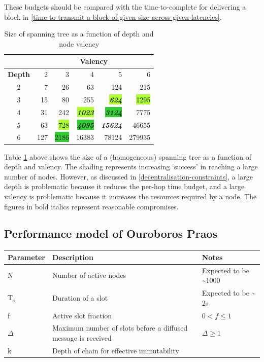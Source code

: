\documentclass[11pt,a4paper]{article}
\begin{document}
These budgets should be compared with the time-to-complete for
delivering a block in \cref{time-to-transmit-a-block-of-given-size-across-given-latencies}.

\begin{table}[h]
\centering
\begin{tabular}{c|rrrrr}
\toprule
& \multicolumn{5}{c}{\textbf{Valency}}\tabularnewline
\midrule
\textbf{Depth} & 2 & 3 & 4 & 5 & 6\tabularnewline
2 & 7 & 26 & 63 & 124 & 215\tabularnewline
3 & 15 & 80 & 255 
& \colorbox{GreenYellow}{\emph{\textbf{624}}} &
\colorbox{GreenYellow}{1295}\tabularnewline
4 & 31 & 242 & \colorbox{GreenYellow}{\emph{\textbf{1023}}} 
& \colorbox{LimeGreen}{\emph{\textbf{3124}}} &
\colorbox{OliveGreen}{7775}\tabularnewline
5 & 63 & \colorbox{GreenYellow}{728} & \colorbox{LimeGreen}{\emph{\textbf{4095}}} 
& \colorbox{OliveGreen}{\emph{\textbf{15624}}} &
\colorbox{OliveGreen}{46655}\tabularnewline
6 & 127 & \colorbox{LimeGreen}{2186} & \colorbox{OliveGreen}{16383} 
& \colorbox{OliveGreen}{78124} & \colorbox{OliveGreen}{279935}\tabularnewline
\bottomrule
\end{tabular}
\caption{\label{tab:span-tree-size}Size of spanning tree as a function of depth and node valency}
\end{table}

Table \ref{tab:span-tree-size} above shows the size of a (homogeneous) spanning tree
as a function of depth and valency. 
The shading represents increasing `success' in reaching a large number
of nodes. However, as discussed in \cref{decentralisation-constraints},
a large depth is problematic
because it reduces the per-hop time budget, and a large valency is
problematic because it increases the resources required by a node. The
figures in bold italics represent reasonable compromises.

\subsection{Performance model of Ouroboros Praos}
\label{performance-model-of-ouroboros-praos}

\begin{longtable}[]{lp{8cm}l}
\toprule
\textbf{Parameter} & \textbf{Description} &
\textbf{Notes}\tabularnewline
\midrule
\endhead
N & Number of active nodes & Expected to be
\textasciitilde{}1000\tabularnewline
T\textsubscript{s} & Duration of a slot & Expected to be
\textasciitilde{} 2s\tabularnewline
f & Active slot fraction & $0 < f \leq 1$\tabularnewline
$\Delta$ & Maximum number of slots before a diffused message is received & $\Delta \geq 1$\tabularnewline
k & Depth of chain for effective immutability &\tabularnewline
\bottomrule
\end{longtable}
\end{document}

